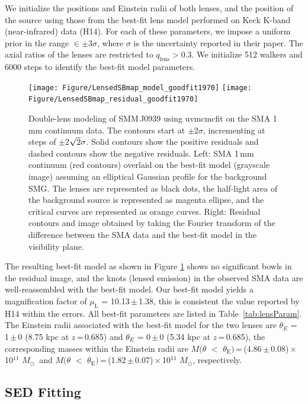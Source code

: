 \documentclass[twocolumn,apj,numberedappendix]{emulateapj}
\newcommand{\Msun}{\mbox{$M_{\odot}$}}
\begin{document}
We initialize the positions and Einstein radii of both lenses, and the position of the source using those
 from the best-fit lens model performed on Keck K-band (near-infrared) data (H14). For each of
these parameters, we impose a uniform prior in the range $\in\pm$3$\sigma$, where $\sigma$ is the uncertainty
reported in their paper. The axial ratios of the lenses are restricted to $q_\textrm{lens} > 0.3$. We initialize 512
walkers and 6000 steps to identify the best-fit model parameters.
\begin{figure}[!tbpH]
\centering
\texttt{[image: Figure/LensedSBmap\_model\_goodfit1970]}
\texttt{[image: Figure/LensedSBmap\_residual\_goodfit1970]}
\caption{Double-lens modeling of SMM\,J0939 using {\sc uvmcmcfit} on the SMA 1\,mm continuum data.
The contours start at $\pm$2$\sigma$, incrementing at
steps of $\pm$2$\sqrt{\rm 2}\sigma$. Solid contours show the positive residuals and dashed contours
show the negative residuals. 
Left: SMA 1\,mm continuum (red contours) overlaid on the best-fit model (grayscale image) assuming an elliptical Gaussian profile for the background SMG. The lenses are represented as black dots, the half-light area of the background source is represented as magenta ellipse, and the critical curves are represented as orange curves. 
Right: Residual contours and image obtained by taking the Fourier transform of the difference between the SMA data and the best-fit model in the visibility plane. \label{fig:lens}}
\end{figure}

The resulting best-fit model as shown in Figure\,\,\ref{fig:lens} shows no significant bowls in the residual
image, and the knots (lensed emission) in the observed SMA data are well-reassembled with the best-fit model.
Our best-fit model yields a magnification
factor of $\mu_\textrm{L}$ = 10.13\,$\pm$\,1.38, this is consistent the value reported by H14 within the errors. All best-fit
parameters are listed in Table~\ref{tab:lensParam}. The Einstein radii associated with the best-fit model for the two lenses are $\theta_{E}$ = 1\,$\pm$\,0 (8.75 kpc at $z$\,=\,0.685) and $\theta_{E}$ = 0\,$\pm$\,0 (5.34\,\,kpc at $z$\,=\,0.685),
the corresponding masses within the Einstein radii are $M(\theta$\,\,$<$\,\,$\theta_\textrm{E})$\,=\,(4.86\,$\pm$\,0.08)\,$\times$\,10$^{11}$\,\,\Msun\ and $M(\theta$\,\,$<$\,\,$\theta_\textrm{E})$\,=\,(1.82\,$\pm$\,0.07)\,$\times$\,10$^{11}$\,\,\Msun, respectively. 


\subsection{SED Fitting} \label{sec:SED}
\end{document}
